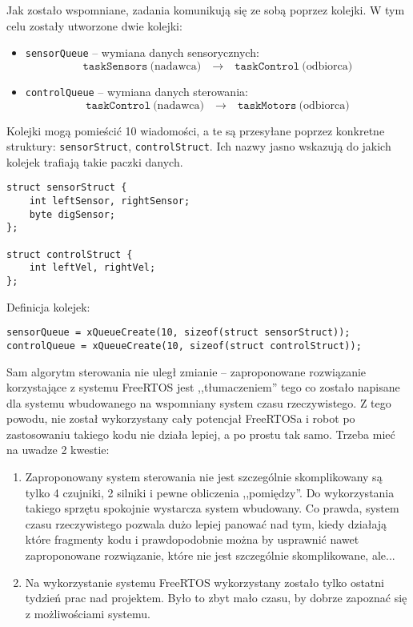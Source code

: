 \documentclass[11pt]{article}
\begin{document}
Jak zostało wspomniane, zadania komunikują się ze sobą poprzez kolejki. W tym celu zostały utworzone dwie kolejki:
\begin{itemize}
\item \texttt{sensorQueue} -- wymiana danych sensorycznych:
\begin{equation*}
\texttt{taskSensors} \ \text{(nadawca)} \quad \rightarrow \quad \texttt{taskControl} \ \text{(odbiorca)}
\end{equation*}

\item \texttt{controlQueue} -- wymiana danych sterowania:
\begin{equation*}
\texttt{taskControl} \ \text{(nadawca)} \quad \rightarrow \quad \texttt{taskMotors} \ \text{(odbiorca)}
\end{equation*}
\end{itemize}

Kolejki mogą pomieścić 10 wiadomości, a te są przesyłane poprzez konkretne struktury: \texttt{sensorStruct}, \texttt{controlStruct}. Ich nazwy jasno wskazują do jakich kolejek trafiają takie paczki danych.
\begin{lstlisting}[firstnumber = 24]
struct sensorStruct {
    int leftSensor, rightSensor;
    byte digSensor;
};

struct controlStruct {
    int leftVel, rightVel;
};
\end{lstlisting}

Definicja kolejek:
\begin{lstlisting}[firstnumber = 37]
sensorQueue = xQueueCreate(10, sizeof(struct sensorStruct));
controlQueue = xQueueCreate(10, sizeof(struct controlStruct));
\end{lstlisting}

Sam algorytm sterowania nie uległ zmianie -- zaproponowane rozwiązanie korzystające z systemu FreeRTOS jest ,,tłumaczeniem'' tego co zostało napisane dla systemu wbudowanego na wspomniany system czasu rzeczywistego.
Z tego powodu, nie został wykorzystany cały potencjał FreeRTOSa i robot po zastosowaniu takiego kodu nie działa lepiej, a po prostu tak samo. Trzeba mieć na uwadze 2 kwestie:
\begin{enumerate}
\item Zaproponowany system sterowania nie jest szczególnie skomplikowany są tylko 4 czujniki, 2 silniki i pewne obliczenia ,,pomiędzy''. Do wykorzystania takiego sprzętu spokojnie wystarcza system wbudowany. Co prawda, system czasu rzeczywistego pozwala dużo lepiej panować nad tym, kiedy działają które fragmenty kodu i prawdopodobnie można by usprawnić nawet zaproponowane rozwiązanie, które nie jest szczególnie skomplikowane, ale...
\item Na wykorzystanie systemu FreeRTOS wykorzystany zostało tylko ostatni tydzień prac nad projektem. Było to zbyt mało czasu, by dobrze zapoznać się z możliwościami systemu.
\end{enumerate}
\end{document}
